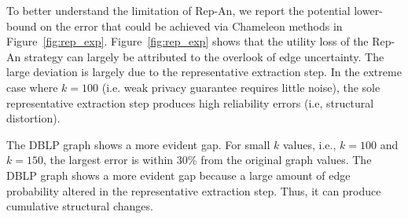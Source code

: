 To better understand the limitation of Rep-An, we report the potential lower-bound on the error that could be achieved via Chameleon methods in Figure~\ref{fig:rep_exp}. Figure~\ref{fig:rep_exp} shows that the utility loss of the Rep-An strategy can largely be attributed to the overlook of edge uncertainty. 
The large deviation is largely due to the representative extraction step. In the extreme case where $k=100$ (i.e. weak privacy guarantee requires little noise), the sole representative extraction step produces high reliability errors (i.e, structural distortion). 

The \textsc{DBLP} graph shows a more evident gap. For small $k$ values, i.e., $k=100$ and $k=150$, the largest error is within 30\% from the original graph values. The \textsc{DBLP} graph shows a more evident gap because a large amount of edge probability altered in the representative extraction step. Thus, it can produce cumulative structural changes. 
  




